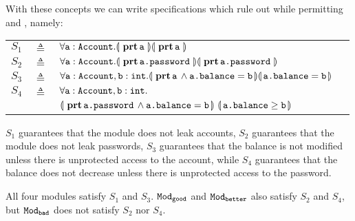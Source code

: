 With these concepts we can write specifications which  rule  out \ModB while permitting \ModA and
\ModC, namely:
\label{s:bankSpecEx}

 


 
 \begin{tabular}{lcll}
 $S_1$   & $\triangleq$   &  $\forall {{\texttt{a}}:{\texttt{Account}}}.{\llparenthesis}\, {\, \mathbf{prt}\, {\texttt{a}}\, } \,{\rrparenthesis}{\llparenthesis}\, {\, \mathbf{prt}\, {\texttt{a}}\, } \,{\rrparenthesis}$
 \\
 $S_2$   & $\triangleq$   &  $\forall {{\texttt{a}}:{\texttt{Account}}}.{\llparenthesis}\, {\, \mathbf{prt}\, {\texttt{a.password}}\, } \,{\rrparenthesis}{\llparenthesis}\, {\, \mathbf{prt}\, {\texttt{a.password}}\, } \,{\rrparenthesis}$
 \\
 $S_3$ & $\triangleq$   &
 $ \forall {{\texttt{a}}:{\texttt{Account}},{\texttt{b}}:{\texttt{int}}}.{\llparenthesis}\, {\, \mathbf{prt}\, {\texttt{a}}\, } \wedge {\texttt{a.balance}}={\texttt{b}} \,{\rrparenthesis}{\llparenthesis}\,  {\texttt{a.balance}}={\texttt{b}}  \,{\rrparenthesis}$
\\
$S_4$ & $\triangleq$   &
  $\forall {\texttt{a}}:{\texttt{Account}},{\texttt{b}}:{\texttt{int}}.$\\
  &  &  ${\llparenthesis}\, {\, \mathbf{prt}\, {\texttt{a.password}}\, } \wedge {\texttt{a.balance}}={\texttt{b}} \,{\rrparenthesis} 
\  {\llparenthesis}\,  {\texttt{a.balance}}\geq {\texttt{b}}  \,{\rrparenthesis}$
 \end{tabular}




\noindent
 $S_1$ guarantees that the module does not leak accounts, 
 $S_2$ guarantees that the module does not leak passwords,
 $S_3$ guarantees that the balance is not modified unless there is unprotected access to the account, while 
 $S_4$ guarantees that the balance does not decrease unless there is unprotected access to the password.
 
 All four modules satisfy $S_1$ and $S_3$. ${\texttt{Mod}}_{{\texttt{good}}}$ and ${\texttt{Mod}}_{{\texttt{better}}}$ also satisfy $S_2$ and $S_4$, but ${\texttt{Mod}}_{{\texttt{bad}}}$ does not satisfy $S_2$ nor $S_4$.
 
